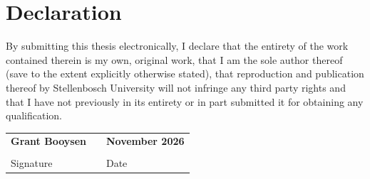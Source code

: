 \section*{Declaration}
{}

By submitting this thesis electronically, I declare that the entirety of the work contained therein is my own, original work, that I am the sole author thereof (save to the extent explicitly otherwise stated), that reproduction and publication thereof by Stellenbosch University will not infringe any third party rights and that I have not previously in its entirety or in part submitted it for obtaining any qualification.

\vspace{2cm}
\noindent
\begin{tabular}{@{}p{6cm}p{1cm}p{6cm}@{}}
\textbf{Grant Booysen} & & \textbf{November 2026} \\
\hrulefill & & \hrulefill \\
Signature & & Date \\

\end{tabular}
